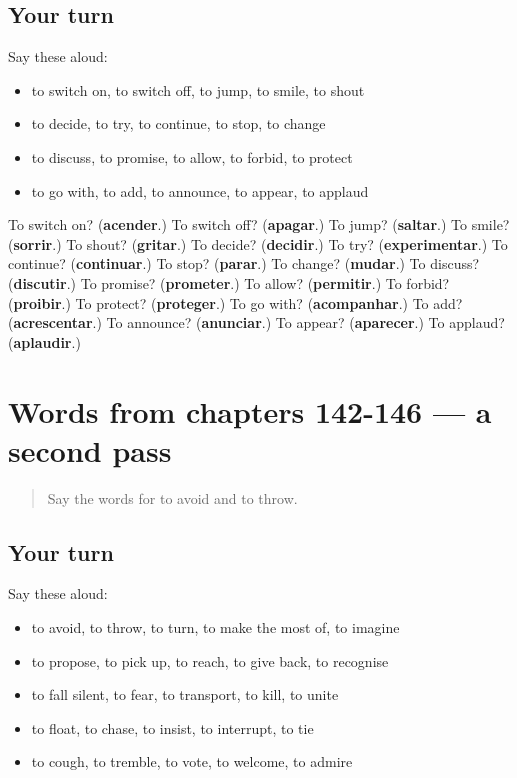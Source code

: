 \subsection*{Your turn}
Say these aloud:

\begin{itemize}
\raggedright
  \item to switch on, to switch off, to jump, to smile, to shout
  \item to decide, to try, to continue, to stop, to change
  \item to discuss, to promise, to allow, to forbid, to protect
  \item to go with, to add, to announce, to appear, to applaud
\end{itemize}

\begin{tcolorbox}[breakable,colback=teal!4,colframe=teal!35!black,title={Before you move on}]
To switch on? (\textbf{acender}.) To switch off? (\textbf{apagar}.) To jump? (\textbf{saltar}.) To smile? (\textbf{sorrir}.) To shout? (\textbf{gritar}.) To decide? (\textbf{decidir}.) To try? (\textbf{experimentar}.) To continue? (\textbf{continuar}.) To stop? (\textbf{parar}.) To change? (\textbf{mudar}.) To discuss? (\textbf{discutir}.) To promise? (\textbf{prometer}.) To allow? (\textbf{permitir}.) To forbid? (\textbf{proibir}.) To protect? (\textbf{proteger}.) To go with? (\textbf{acompanhar}.) To add? (\textbf{acrescentar}.) To announce? (\textbf{anunciar}.) To appear? (\textbf{aparecer}.) To applaud? (\textbf{aplaudir}.)
\end{tcolorbox}
\section[(dialogue)]{Words from chapters 142-146 — a second pass}

\label{lesson:PT-R146-second-pass-words-from-chapters-142-146}



\begin{quote}
Say the words for to avoid and to throw.
\end{quote}

\subsection*{Your turn}
Say these aloud:

\begin{itemize}
\raggedright
  \item to avoid, to throw, to turn, to make the most of, to imagine
  \item to propose, to pick up, to reach, to give back, to recognise
  \item to fall silent, to fear, to transport, to kill, to unite
  \item to float, to chase, to insist, to interrupt, to tie
  \item to cough, to tremble, to vote, to welcome, to admire
\end{itemize}

